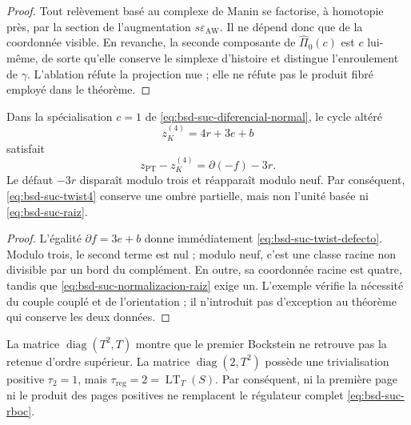 \begin{proof}
Tout relèvement basé au complexe de Manin se factorise, à homotopie près, par la
section de l'augmentation \(s\varepsilon_{\mathrm{AW}}\). Il ne dépend donc que
de la coordonnée visible. En revanche, la seconde composante de
\(\widehat\Pi_0(c)\) est \(c\) lui-même, de sorte qu'elle conserve le simplexe
d'histoire et distingue l'enroulement de \(\gamma\). L'ablation réfute la
projection nue ; elle ne réfute pas le produit fibré employé dans le théorème.
\end{proof}

\begin{ablation}
\label{abl:bsd-suc-twist}
Dans la spécialisation \(c=1\) de
\eqref{eq:bsd-suc-diferencial-normal}, le cycle altéré
\begin{equation}\label{eq:bsd-suc-twist4}
 z_K^{(4)}=4r+3e+b
\end{equation}
satisfait
\begin{equation}\label{eq:bsd-suc-twist-defecto}
 z_{\mathrm{PT}}-z_K^{(4)}
 =\partial(-f)-3r.
\end{equation}
Le défaut \(-3r\) disparaît modulo trois et réapparaît modulo neuf. Par
conséquent, \eqref{eq:bsd-suc-twist4} conserve une ombre partielle, mais non
l'unité basée ni \eqref{eq:bsd-suc-raiz}.
\end{ablation}

\begin{proof}
L'égalité \(\partial f=3e+b\) donne immédiatement
\eqref{eq:bsd-suc-twist-defecto}. Modulo trois, le second terme est nul ;
modulo neuf, c'est une classe racine non divisible par un bord du complément.
En outre, sa coordonnée racine est quatre, tandis que
\eqref{eq:bsd-suc-normalizacion-raiz} exige un. L'exemple vérifie la
nécessité du couple couplé et de l'orientation ; il n'introduit pas d'exception
au théorème qui conserve les deux données.
\end{proof}

\begin{ablation}
\label{abl:bsd-suc-bockstein}
La matrice \(\operatorname{diag}(T^2,T)\) montre que le premier Bockstein ne
retrouve pas la retenue d'ordre supérieur. La matrice
\(\operatorname{diag}(2,T^2)\) possède une trivialisation positive
\(\tau_2=1\), mais
\(\tau_{\mathrm{reg}}=2=\operatorname{LT}_{T}(S)\). Par conséquent, ni la
première page ni le produit des pages positives ne remplacent le régulateur
complet \eqref{eq:bsd-suc-rboc}.
\end{ablation}

